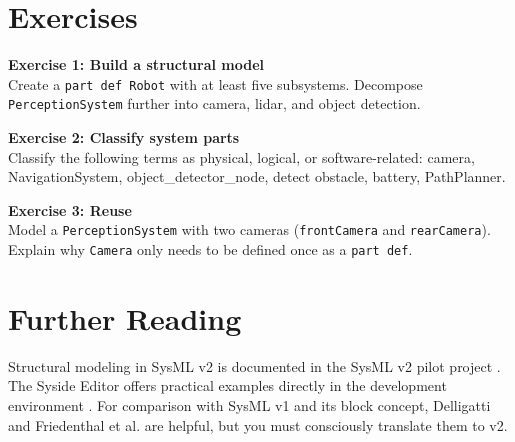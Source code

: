\section{Exercises}
\begin{uebungbox}
\textbf{Exercise 1: Build a structural model}\\
Create a \texttt{part def Robot} with at least five subsystems. Decompose \texttt{PerceptionSystem} further into camera, lidar, and object detection.
\end{uebungbox}

\begin{uebungbox}
\textbf{Exercise 2: Classify system parts}\\
Classify the following terms as physical, logical, or software-related: camera, NavigationSystem, object\_detector\_node, detect obstacle, battery, PathPlanner.
\end{uebungbox}

\begin{uebungbox}
\textbf{Exercise 3: Reuse}\\
Model a \texttt{PerceptionSystem} with two cameras (\texttt{frontCamera} and \texttt{rearCamera}). Explain why \texttt{Camera} only needs to be defined once as a \texttt{part def}.
\end{uebungbox}

\section{Further Reading}
Structural modeling in SysML v2 is documented in the SysML v2 pilot project \cite{sysmlv2pilot}. The Syside Editor offers practical examples directly in the development environment \cite{syside}. For comparison with SysML v1 and its block concept, Delligatti \cite{delligatti2014} and Friedenthal et al. \cite{friedenthal2014} are helpful, but you must consciously translate them to v2.

